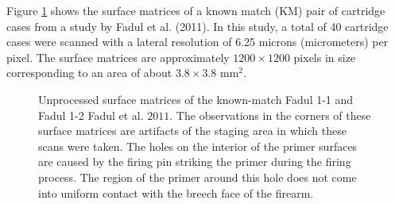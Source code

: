 Figure \ref{fig:cartridgeCasePair-latex} shows the surface matrices of a known match (KM) pair of cartridge cases from a study by Fadul et al. (2011).
In this study, a total of 40 cartridge cases were scanned with a lateral resolution of 6.25 microns (micrometers) per pixel.
The surface matrices are approximately \(1200 \times 1200\) pixels in size corresponding to an area of about \(3.8 \times 3.8\) mm\(^2\).

\begin{figure}[htbp]

{\centering {}

}

\caption{Unprocessed surface matrices of the known-match Fadul 1-1 and Fadul 1-2 Fadul et al. \(2011\). The observations in the corners of these surface matrices are artifacts of the staging area in which these scans were taken. The holes on the interior of the primer surfaces are caused by the firing pin striking the primer during the firing process. The region of the primer around this hole does not come into uniform contact with the breech face of the firearm.}\label{fig:cartridgeCasePair-latex}
\end{figure}

